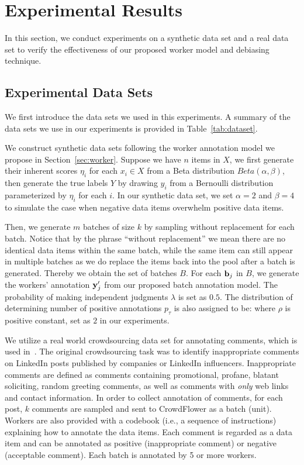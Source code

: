 
\section{Experimental Results}
\label{sec:exp}

In this section, we conduct experiments on a synthetic data set and a real data set 
to verify the effectiveness of our proposed worker model and debiasing technique.  

\subsection{Experimental Data Sets}
We first introduce the data sets we used in this experiments.  
A summary of the data sets we use in our experiments is provided in Table~\ref{tab:dataset}.  

We construct synthetic data sets following the worker annotation model we propose in Section~\ref{sec:worker}.
Suppose we have $n$ items in $X$, 
we first generate their inherent scores $\eta_i$ for each $x_i \in X$ 
from a Beta distribution $Beta(\alpha, \beta)$, 
then generate the true labels $Y$ by drawing $y_i$ from a Bernoulli distribution parameterized by $\eta_i$ for each $i$.  
In our synthetic data set, we set $\alpha = 2$ and $\beta = 4$ to simulate the case when negative data items overwhelm positive data items.

Then, we generate $m$ batches of size $k$ by sampling without replacement for each batch.  
Notice that by the phrase ``without replacement'' we mean there are no identical data items within the same batch, 
while the same item can still appear in multiple batches 
as we do replace the items back into the pool after a batch is generated.  
Thereby we obtain the set of batches $B$.  
For each ${\mathbf{b}}_j$ in $B$, we generate the workers' annotation ${\mathbf{y}}_j'$ from our proposed batch annotation model.  
The probability of making independent judgments $\lambda$ is set as $0.5$.
The distribution of determining number of positive annotations $p_{\tau}$ is also assigned to be:
%
where $\rho$ is positive constant, set as $2$ in our experiments.  

We utilize a real world crowdsourcing data set for annotating comments, which is used in~\cite{zhuang:wsdm2015}.
The original crowdsourcing task was to identify inappropriate comments on LinkedIn posts published by companies or LinkedIn influencers.  
Inappropriate comments are defined as comments containing promotional, profane, blatant soliciting, random greeting comments, 
as well as comments with \emph{only} web links and contact information.  
In order to collect annotation of comments, 
for each post, $k$ comments are sampled and sent to CrowdFlower as a batch (unit).  
Workers are also provided with a codebook (i.e., a sequence of instructions) 
explaining how to annotate the data items.  
Each comment is regarded as a data item 
and can be annotated as positive (inappropriate comment) or negative (acceptable comment).  
Each batch is annotated by 5 or more workers.  

